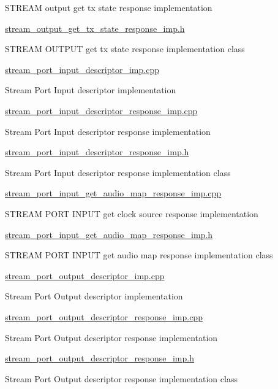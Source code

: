 S\+T\+R\+E\+AM output get tx state response implementation

\hyperlink{stream__output__get__tx__state__response__imp_8h}{stream\+\_\+output\+\_\+get\+\_\+tx\+\_\+state\+\_\+response\+\_\+imp.\+h}

S\+T\+R\+E\+AM O\+U\+T\+P\+UT get tx state response implementation class

\hyperlink{stream__port__input__descriptor__imp_8cpp}{stream\+\_\+port\+\_\+input\+\_\+descriptor\+\_\+imp.\+cpp}

Stream Port Input descriptor implementation

\hyperlink{stream__port__input__descriptor__response__imp_8cpp}{stream\+\_\+port\+\_\+input\+\_\+descriptor\+\_\+response\+\_\+imp.\+cpp}

Stream Port Input descriptor response implementation

\hyperlink{stream__port__input__descriptor__response__imp_8h}{stream\+\_\+port\+\_\+input\+\_\+descriptor\+\_\+response\+\_\+imp.\+h}

Stream Port Input descriptor response implementation class

\hyperlink{stream__port__input__get__audio__map__response__imp_8cpp}{stream\+\_\+port\+\_\+input\+\_\+get\+\_\+audio\+\_\+map\+\_\+response\+\_\+imp.\+cpp}

S\+T\+R\+E\+AM P\+O\+RT I\+N\+P\+UT get clock source response implementation

\hyperlink{stream__port__input__get__audio__map__response__imp_8h}{stream\+\_\+port\+\_\+input\+\_\+get\+\_\+audio\+\_\+map\+\_\+response\+\_\+imp.\+h}

S\+T\+R\+E\+AM P\+O\+RT I\+N\+P\+UT get audio map response implementation class

\hyperlink{stream__port__output__descriptor__imp_8cpp}{stream\+\_\+port\+\_\+output\+\_\+descriptor\+\_\+imp.\+cpp}

Stream Port Output descriptor implementation

\hyperlink{stream__port__output__descriptor__response__imp_8cpp}{stream\+\_\+port\+\_\+output\+\_\+descriptor\+\_\+response\+\_\+imp.\+cpp}

Stream Port Output descriptor response implementation

\hyperlink{stream__port__output__descriptor__response__imp_8h}{stream\+\_\+port\+\_\+output\+\_\+descriptor\+\_\+response\+\_\+imp.\+h}

Stream Port Output descriptor response implementation class

